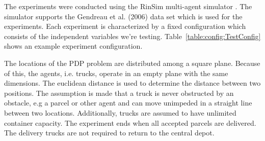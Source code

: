 \documentclass[../main.tex]{subfiles}
\begin{document}
The experiments were conducted using the RinSim multi-agent simulator \cite{van2012rinsim}. The simulator supports the Gendreau et al. \cite{gendreau2006neighborhood} (2006) data set which is used for the experiments. Each experiment is characterized by a fixed configuration which consists of the independent variables we're testing. Table~\ref{table:config:TestConfig} shows an example experiment configuration.


The locations of the PDP problem are distributed among a square plane. Because of this, the agents, i.e. trucks, operate in an empty plane with the same dimensions. The euclidean distance is used to determine the distance between two positions. The assumption is made that a truck is never obstructed by an obstacle, e.g a parcel or other agent and can move unimpeded in a straight line between two locations. Additionally, trucks are assumed to have unlimited container capacity. The experiment ends when all accepted parcels are delivered. The delivery trucks are not required to return to the central depot.
\end{document}
